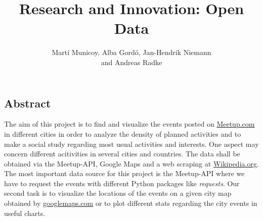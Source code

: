 \documentclass[12pt,a4paper]{article}
\author{Martí Municoy, Alba Gordó, Jan-Hendrik Niemann\\ and Andreas Radke}
\title{Research and Innovation: Open Data}
\begin{document}
	\maketitle
	
\subsection*{Abstract}

The aim of this project is to find and visualize the events posted on \url{Meetup.com} in different cities in order to analyze the density of planned activities and to make a social study regarding most usual activities and interests. One aspect may concern different acitivities in several cities and countries. The data shall be obtained via the Meetup-API, Google Maps and a web scraping at \url{Wikipedia.org}. The most important data source for this project is the Meetup-API where we have to request the events with different Python packages like \emph{requests}. Our second task is to visualize the locations of the events on a given city map obtained by \url{googlemaps.com} or to plot different stats regarding the city events in useful charts. 

\tableofcontents
	









\newpage

{}

\end{document}
